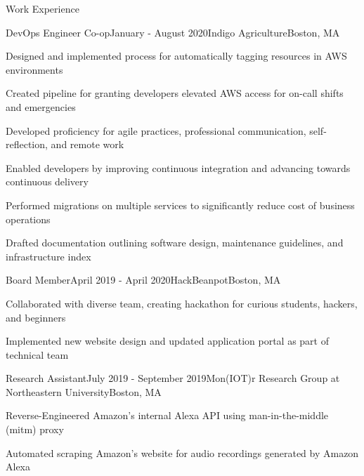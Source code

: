 \documentclass{resume}
\begin{document}
\begin{rSection}{Work Experience}

\begin{rSubsection}{DevOps Engineer Co-op}{January - August 2020}{Indigo Agriculture}{Boston, MA}
\item Designed and implemented process for automatically tagging resources in AWS environments
\item Created pipeline for granting developers elevated AWS access for on-call shifts and emergencies
\item Developed proficiency for agile practices, professional communication, self-reflection, and remote work
\item Enabled developers by improving continuous integration and advancing towards continuous delivery
\item Performed migrations on multiple services to significantly reduce cost of business operations
\item Drafted documentation outlining software design, maintenance guidelines, and infrastructure index
\end{rSubsection}

\begin{rSubsection}{Board Member}{April 2019 - April 2020}{HackBeanpot}{Boston, MA}
\item Collaborated with diverse team, creating hackathon for curious students, hackers, and beginners
\item Implemented new website design and updated application portal as part of technical team
\end{rSubsection}

\begin{rSubsection}{Research Assistant}{July 2019 - September 2019}{Mon(IOT)r Research Group at Northeastern University}{Boston, MA}
\item Reverse-Engineered Amazon's internal Alexa API using man-in-the-middle (mitm) proxy 
\item Automated scraping Amazon's website for audio recordings generated by Amazon Alexa
\end{rSubsection}
\end{rSection}
\end{document}
